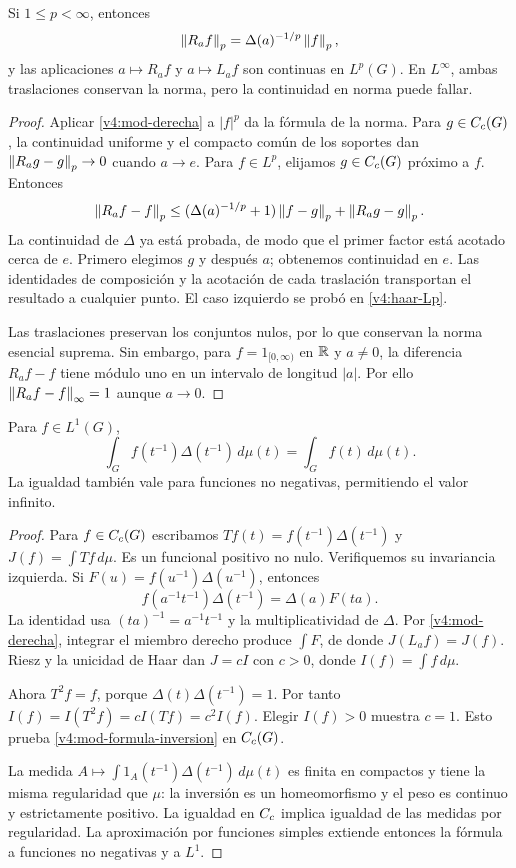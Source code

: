 \begin{proposicion}\label{v4:mod-Lp}
Si $1\leq p<\infty$, entonces
\[
 \left\lVert R_af\right\rVert_p=\Delta(a)^{-1/p}\left\lVert f\right\rVert_p,
\]
y las aplicaciones $a\mapsto R_af$ y $a\mapsto L_af$ son continuas en $L^p(G)$. En $L^\infty$, ambas traslaciones conservan la norma, pero la continuidad en norma puede fallar.
\end{proposicion}
\begin{proof}
Aplicar \eqref{v4:mod-derecha} a $|f|^p$ da la fórmula de la norma. Para $g\in C_c(G)$, la continuidad uniforme y el compacto común de los soportes dan $\left\lVert R_ag-g\right\rVert_p\to0$ cuando $a\to e$. Para $f\in L^p$, elijamos $g\in C_c(G)$ próximo a $f$. Entonces
\[
 \left\lVert R_af-f\right\rVert_p\leq
 (\Delta(a)^{-1/p}+1)\left\lVert f-g\right\rVert_p+\left\lVert R_ag-g\right\rVert_p.
\]
La continuidad de $\Delta$ ya está probada, de modo que el primer factor está acotado cerca de $e$. Primero elegimos $g$ y después $a$; obtenemos continuidad en $e$. Las identidades de composición y la acotación de cada traslación transportan el resultado a cualquier punto. El caso izquierdo se probó en \ref{v4:haar-Lp}.

Las traslaciones preservan los conjuntos nulos, por lo que conservan la norma esencial suprema. Sin embargo, para $f=1_{[0,\infty)}$ en $\mathbb R$ y $a\ne0$, la diferencia $R_af-f$ tiene módulo uno en un intervalo de longitud $|a|$. Por ello $\left\lVert R_af-f\right\rVert_\infty=1$ aunque $a\to0$.
\end{proof}

\begin{teorema}\label{v4:mod-inversion}
Para $f\in L^1(G)$,
\begin{equation}\label{v4:mod-formula-inversion}
 \int_G f(t^{-1})\Delta(t^{-1})\,d\mu(t)=\int_G f(t)\,d\mu(t).
\end{equation}
La igualdad también vale para funciones no negativas, permitiendo el valor infinito.
\end{teorema}
\begin{proof}
Para $f\in C_c(G)$ escribamos
$Tf(t)=f(t^{-1})\Delta(t^{-1})$ y $J(f)=\int Tf\,d\mu$.
Es un funcional positivo no nulo. Verifiquemos su invariancia izquierda. Si
$F(u)=f(u^{-1})\Delta(u^{-1})$, entonces
\[
 f(a^{-1}t^{-1})\Delta(t^{-1})=\Delta(a)F(ta).
\]
La identidad usa $(ta)^{-1}=a^{-1}t^{-1}$ y la multiplicatividad de $\Delta$. Por \eqref{v4:mod-derecha}, integrar el miembro derecho produce $\int F$, de donde $J(L_af)=J(f)$. Riesz y la unicidad de Haar dan $J=cI$ con $c>0$, donde $I(f)=\int f\,d\mu$.

Ahora $T^2f=f$, porque $\Delta(t)\Delta(t^{-1})=1$. Por tanto
$I(f)=I(T^2f)=cI(Tf)=c^2I(f)$. Elegir $I(f)>0$ muestra $c=1$. Esto prueba \eqref{v4:mod-formula-inversion} en $C_c(G)$.

La medida $A\mapsto\int 1_A(t^{-1})\Delta(t^{-1})\,d\mu(t)$ es finita en compactos y tiene la misma regularidad que $\mu$: la inversión es un homeomorfismo y el peso es continuo y estrictamente positivo. La igualdad en $C_c$ implica igualdad de las medidas por regularidad. La aproximación por funciones simples extiende entonces la fórmula a funciones no negativas y a $L^1$.
\end{proof}

